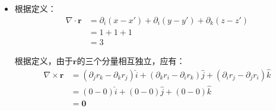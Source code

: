 \documentclass[a4paper,fontset=none]{ctexart}
\begin{document}
\begin{itemize}
        \textparagraph 根据公式$\nabla\cdot(f\bm{A}) = f(\nabla\cdot\bm{A}) + (\nabla f)\cdot\bm{A}$可得：
        \begin{align*}
            \nabla\cdot\left(\frac{\bm{r}}{r^3}\right)
            &= \frac{1}{r^3}\cdot(\nabla\cdot\bm{r}) + \left(\nabla\frac{1}{r^3}\right)\cdot\bm{r} \\
            &= \frac{1}{r^3}\left[\partial_i (x-x') + \partial_i (y-y') + \partial_k (z-z')\right] + \left(-\frac{3}{r^5}\bm{r}\right)\cdot\bm{r} \\
            &= \frac{1}{r^3}\cdot(1+1+1) - \frac{3}{r^5}\cdot r^2 \\
            &= \frac{3}{r^3} - \frac{3}{r^3} \\
            &= 0 \qquad (r \neq 0)
        \end{align*}
        同理：
        \begin{align*}
            \nabla'\cdot\left(\frac{\bm{r}}{r^3}\right)
            &= \frac{1}{r^3}\cdot(\nabla\cdot\bm{r}) + \left(\nabla'\frac{1}{r^3}\right)\cdot\bm{r} \\
            &= \frac{1}{r^3}\left[\partial'_i (x-x') + \partial'_i (y-y') + \partial'_k (z-z')\right] + \left(\frac{3}{r^5}\bm{r}\right)\cdot\bm{r} \\
            &= \frac{1}{r^3}\cdot(-1-1-1) + \frac{3}{r^5}\cdot r^2 \\
            &= -\frac{3}{r^3} + \frac{3}{r^5}\cdot r^2 \\
            &= 0 \qquad (r \neq 0)
        \end{align*}
        故在$r \neq 0$时，$\nabla\cdot\left(\dfrac{\bm{r}}{r^3}\right) = -\nabla'\cdot\left(\dfrac{\bm{r}}{r^3}\right) = 0$。

        \item[3.(2)]
        \textparagraph 根据定义：
        \begin{align*}
        \nabla\cdot\bm{r}
        &= \partial_i (x-x') + \partial_i (y-y') + \partial_k (z-z') \\
        &= 1 + 1 + 1 \\
        &= 3
        \end{align*}

        \textparagraph 根据定义，由于$\bm{r}$的三个分量相互独立，应有：
        \begin{align*}
            \nabla\times\bm{r}
            &= (\partial_j r_k - \partial_k r_j)\hat{i} + (\partial_k r_i - \partial_i r_k)\hat{j} + (\partial_i r_j - \partial_j r_i)\hat{k} \\
            &= (0-0)\hat{i} + (0-0)\hat{j} + (0-0)\hat{k} \\
            &= \bm{0}
        \end{align*}


\end{itemize}
\end{document}
